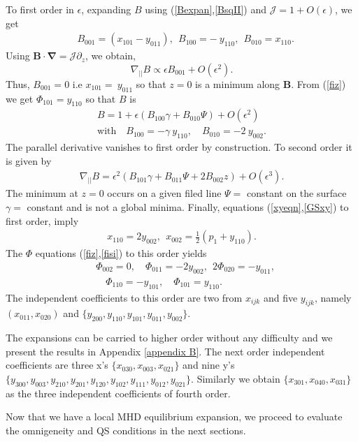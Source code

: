 \documentclass[aip,pop,reprint]{revtex4-1}
\newcommand*{\ep}{\epsilon}
\newcommand*{\B}{\bm{B}}
\newcommand*{\Jac}{\mathscr{J}}
\newcommand*{\dpl}{\nabla_{||}}
\newcommand*{\dl}{\bm{\nabla}}
\begin{document}
 To first order in $\epsilon$, expanding $B$ using (\ref{Bexpan},\ref{BsqII}) and $\Jac=1+O(\epsilon)$, we get
\begin{align*}
&B_{001}=(x_{101}-y_{011}),\:\: B_{100}=-\:y_{110},\:\:B_{010}= x_{110}.
\end{align*}
Using $\B\cdot\dl = \Jac \partial_z$, we obtain,
$$\dpl B \propto \epsilon B_{001}+O(\ep^2).$$
Thus, $B_{001}=0$ i.e $x_{101}=\:y_{011}$ so that $z=0$ is a minimum along $\B$. From (\ref{fiz}) we get $\Phi_{101}=y_{110}$ so that $B$ is 
\begin{align}
B= 1+ \ep(B_{100} \gamma +B_{010}\Psi)+O(\epsilon^2) \nonumber\\
\text{with} \quad B_{100}=- \gamma\: y_{110}, \quad B_{010}=- 2\: y_{002}.
\label{Bsqrseries}
\end{align}
The parallel derivative vanishes to first order by construction. To second order it is given by
\begin{align}
\dpl B =\ep^2(B_{101}\gamma + B_{011}\Psi +2 B_{002} z)+O(\epsilon^3). \label{dplb}
\end{align}
The minimum at $z=0$ occurs on a given filed line $\Psi=$ constant on the surface $\gamma=$ constant and is not a global minima.
Finally, equations (\ref{xyeqn},\ref{GSxy}) to first order, imply 
\begin{align}
x_{110}= 2 y_{002}, \:\: x_{002}= \frac{1}{2}(p_1+y_{110}).\nonumber
\end{align}
The $\Phi$ equations (\ref{fiz},\ref{fisi}) to this order yields
\begin{align}
&\Phi_{002} = 0, \quad \Phi_{011} = -2 y_{002},\:\: 2\Phi_{020} = -y_{011},\\
&\quad \Phi_{110} = -y_{101}, \quad \Phi_{101}= y_{110}. \nonumber
\end{align}
The independent coefficients to this order are two from $x_{ijk}$ and five $y_{ijk}$, namely $(x_{011},x_{020})$ and $\{y_{200},y_{110},y_{101},y_{011},y_{002}\}$. 

The expansions can be carried to higher order without any difficulty and we present the results in Appendix \ref{appendix B}. The next order independent coefficients are three x's $\{x_{030},x_{003},x_{021}\}$ and nine y's $\{y_{300},y_{003},y_{210},y_{201}, y_{120},y_{102},y_{111},y_{012},y_{021}\}$. Similarly we obtain $\{x_{301},x_{040},x_{031}\}$ as the three independent coefficients of fourth order.
 
 Now that we have a local MHD equilibrium expansion, we proceed to evaluate the omnigeneity and QS conditions in the next sections.
\end{document}
